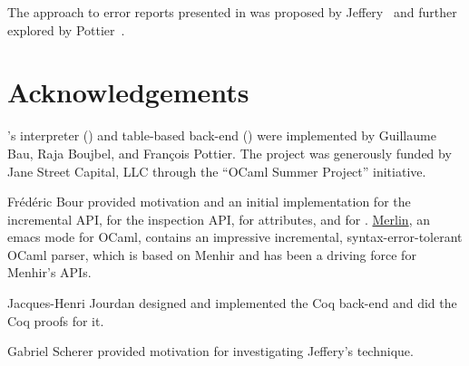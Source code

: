 \documentclass[onecolumn,11pt,nocopyrightspace,preprint]{sigplanconf}
\begin{document}
The approach to error reports presented in  was
proposed by Jeffery~\citeyear{jeffery-03} and further explored by
Pottier~\citeyear{pottier-reachability-cc-2016}.


\section{Acknowledgements}

\menhir's interpreter (\ointerpret) and table-based back-end (\otable) were
implemented by Guillaume Bau, Raja Boujbel, and François Pottier. The project
was generously funded by Jane Street Capital, LLC through the ``OCaml Summer
Project'' initiative.

Frédéric Bour provided motivation and an initial implementation for the
incremental API, for the inspection API, for attributes, and for \menhirsdk.
\href{https://github.com/ocaml/merlin}{Merlin}, an emacs mode for OCaml,
contains an impressive incremental, syntax-error-tolerant OCaml parser,
which is based on Menhir and has been a driving force for Menhir's APIs.

Jacques-Henri Jourdan designed and implemented the Coq back-end and did the
Coq proofs for it.

Gabriel Scherer provided motivation for investigating Jeffery's technique.





\end{document}
